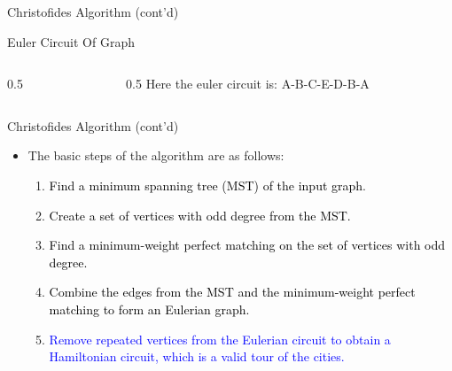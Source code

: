 \documentclass[12pt]{beamer}
\begin{document}
\begin{frame}{Christofides Algorithm (cont'd)}
    \begin{block}{Euler Circuit Of Graph}
    \begin{center}
    \begin{columns}
    \begin{column}{0.5\textwidth}
    \end{column}
    \begin{column}{0.5\textwidth}
    Here the euler circuit is:
    A-B-C-E-D-B-A
    \end{column}
    \end{columns}
    \end{center}
    \end{block}
\end{frame}
\begin{frame}{Christofides Algorithm (cont'd)}
 \begin{itemize}
        \item The basic steps of the algorithm are as follows:
        \begin{enumerate}
          \item \textcolor{black}{Find a minimum spanning tree (MST) of the input graph}.
         \item \textcolor{black}{Create a set of vertices with odd degree from the MST.}
         \item \textcolor{black}{Find a minimum-weight perfect matching on the set of vertices with odd degree.}
          \item \textcolor{black} {Combine the edges from the MST and the minimum-weight perfect matching to form an Eulerian graph.}
          \item \textcolor{blue}{Remove repeated vertices from the Eulerian circuit to obtain a Hamiltonian circuit, which is a valid tour of the cities.}
        \end{enumerate}
    \end{itemize}
\end{frame}
\end{document}
